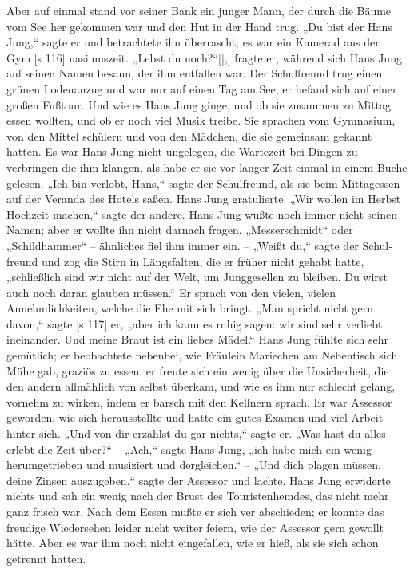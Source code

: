 Aber auf einmal stand vor seiner Bank ein
junger Mann, der durch die Bäume vom See her
gekommen war und den Hut in der Hand trug. „Du
bist der Hans Jung,“ sagte er und betrachtete ihn
überrascht; es war ein Kamerad aus der Gym­
[s 116]
nasiumszeit. „Lebst du noch?“[|,] fragte er, während
sich Hans Jung auf seinen Namen besann, der ihm
entfallen war. Der Schulfreund trug einen grünen
Lodenanzug und war nur auf einen Tag am See;
er befand sich auf einer großen Fußtour. Und wie
es Hans Jung ginge, und ob sie zusammen zu Mittag
essen wollten, und ob er noch viel Musik treibe.
Sie sprachen vom Gymnasium, von den Mittel­
schülern und von den Mädchen, die sie gemeinsam
gekannt hatten. Es war Hans Jung nicht ungelegen,
die Wartezeit bei Dingen zu verbringen die ihm
klangen, als habe er sie vor langer Zeit einmal in
einem Buche gelesen. „Ich bin verlobt, Hans,“ sagte
der Schulfreund, als sie beim Mittagessen auf der
Veranda des Hotels saßen. Hans Jung gratulierte.
„Wir wollen im Herbst Hochzeit machen,“ sagte der
andere. Hans Jung wußte noch immer nicht seinen
Namen; aber er wollte ihn nicht darnach fragen.
„Messerschmidt“ oder „Schildhammer“ – ähnliches
fiel ihm immer ein. – „Weißt du,“ sagte der Schul­
freund und zog die Stirn in Längsfalten, die er früher
nicht gehabt hatte, „schließlich sind wir nicht auf der
Welt, um Junggesellen zu bleiben. Du wirst auch
noch daran glauben müssen.“ Er sprach von den
vielen, vielen Annehmlichkeiten, welche die Ehe mit
sich bringt. „Man spricht nicht gern davon,“ sagte
[s 117]
er, „aber ich kann es ruhig sagen: wir sind sehr
verliebt ineinander. Und meine Braut ist ein liebes
Mädel.“ Hans Jung fühlte sich sehr gemütlich; er
beobachtete nebenbei, wie Fräulein Mariechen am
Nebentisch sich Mühe gab, graziös zu essen, er freute
sich ein wenig über die Unsicherheit, die den andern
allmählich von selbst überkam, und wie es ihm nur
schlecht gelang, vornehm zu wirken, indem er barsch
mit den Kellnern sprach. Er war Assessor geworden,
wie sich herausstellte und hatte ein gutes Examen
und viel Arbeit hinter sich. „Und von dir erzählst
du gar nichts,“ sagte er. „Was hast du alles erlebt
die Zeit über?“ – „Ach,“ sagte Hans Jung, „ich
habe mich ein wenig herumgetrieben und musiziert
und dergleichen.“ – „Und dich plagen müssen, deine
Zinsen auszugeben,“ sagte der Assessor und lachte.
Hans Jung erwiderte nichts und sah ein wenig nach
der Brust des Touristenhemdes, das nicht mehr ganz
frisch war. Nach dem Essen mußte er sich ver­
abschieden; er konnte das freudige Wiedersehen leider
nicht weiter feiern, wie der Assessor gern gewollt
hätte. Aber es war ihm noch nicht eingefallen, wie
er hieß, als sie sich schon getrennt hatten.

